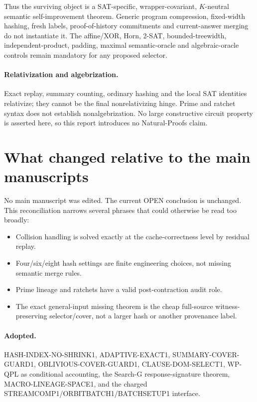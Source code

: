 \documentclass[11pt]{article}
\begin{document}
Thus the surviving object is a SAT-specific, wrapper-covariant, $K$-neutral
semantic self-improvement theorem.  Generic program compression, fixed-width
hashing, fresh labels, proof-of-history commitments and current-answer merging
do not instantiate it.  The affine/XOR, Horn, 2-SAT, bounded-treewidth,
independent-product, padding, maximal semantic-oracle and algebraic-oracle
controls remain mandatory for any proposed selector.

\paragraph{Relativization and algebrization.}
Exact replay, summary counting, ordinary hashing and the local SAT identities
relativize; they cannot be the final nonrelativizing hinge.  Prime and ratchet
syntax does not establish nonalgebrization.  No large constructive circuit
property is asserted here, so this report introduces no Natural-Proofs claim.

\section{What changed relative to the main manuscripts}

No main manuscript was edited.  The current OPEN conclusion is unchanged.
This reconciliation narrows several phrases that could otherwise be read too
broadly:

\begin{itemize}
\item Collision handling is solved exactly at the cache-correctness level by
  residual replay.
\item Four/six/eight hash settings are finite engineering choices, not missing
  semantic merge rules.
\item Prime lineage and ratchets have a valid post-contraction audit role.
\item The exact general-input missing theorem is the cheap full-source
  witness-preserving selector/cover, not a larger hash or another provenance
  label.
\end{itemize}

\paragraph{Adopted.}
HASH-INDEX-NO-SHRINK1, ADAPTIVE-EXACT1, SUMMARY-COVER-GUARD1,
OBLIVIOUS-COVER-GUARD1, CLAUSE-DOM-SELECT1, WP-QPL as conditional accounting,
the Search-G response-signature theorem, MACRO-LINEAGE-SPACE1, and the charged
STREAMCOMP1/ORBITBATCH1/BATCHSETUP1 interface.
\end{document}
